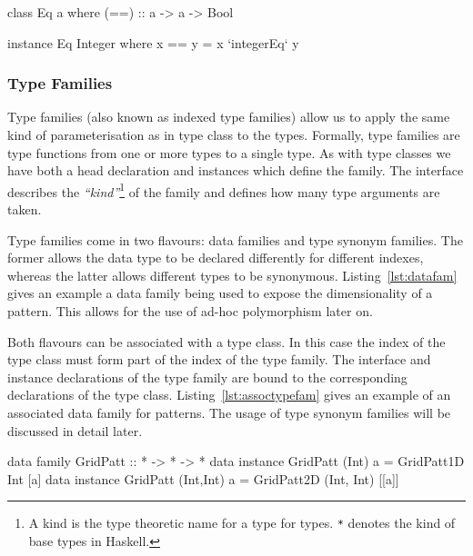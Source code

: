 \documentclass[12pt,a4paper,twoside]{scrbook}
\begin{document}
\begin{hflisting}[label=lst:typeclass, caption={An example type class for
    equality. Showing the declaration and the instance for integers. Where
    \texttt{integerEq} is the implementation of integer equality on the target
    machine.}]

class Eq a where
  (==) :: a -> a -> Bool

instance Eq Integer where
  x == y =  x `integerEq` y

\end{hflisting}

\subsubsection{Type Families}
\label{sec:typefam}

Type families (also known as indexed type families) allow us to apply the same
kind of parameterisation as in type class to the types. Formally, type families
are type functions from one or more types to a single type. As with type classes
we have both a head declaration and instances which define the family. The
interface describes the \emph{``kind''}\footnote{A kind is the type theoretic
  name for a type for types. \texttt{*} denotes the kind of base types in
  Haskell.} of the family and defines how many type arguments are taken.

Type families come in two flavours: data families and type synonym families. The
former allows the data type to be declared differently for different indexes,
whereas the latter allows different types to be synonymous.
Listing~\ref{lst:datafam} gives an example a data family being used to expose
the dimensionality of a pattern. This allows for the use of ad-hoc polymorphism
later on.

Both flavours can be associated with a type class. In this case the index of the
type class must form part of the index of the type family. The interface and
instance declarations of the type family are bound to the corresponding
declarations of the type class. Listing~\ref{lst:assoctypefam} gives an example
of an associated data family for patterns. The usage of type synonym families
will be discussed in detail later.

\begin{hflisting}[label=lst:datafam, caption=The data family declares two
  different constructors for 1D and 2D lists. The dimensionality of the list is
  exposed in the type.]

data family GridPatt :: * -> * -> *
data instance GridPatt (Int) a =
    GridPatt1D Int [a]
data instance GridPatt (Int,Int) a =
    GridPatt2D (Int, Int) [[a]]

\end{hflisting}
\end{document}
